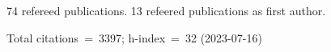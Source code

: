 74 refereed publications. 13 refeered publications as first author.

Total citations~=~3397; h-index~=~32 (2023-07-16)